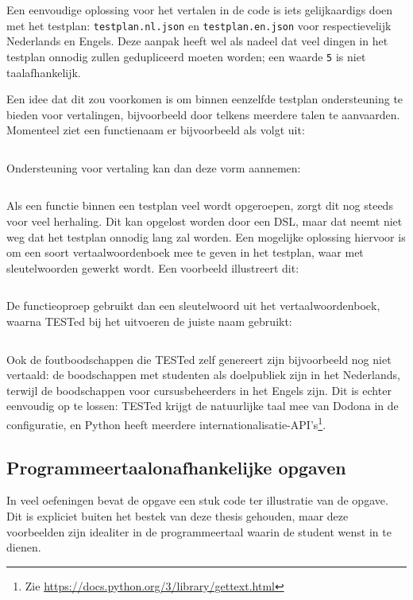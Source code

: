 Een eenvoudige oplossing voor het vertalen in de code is iets gelijkaardigs doen met het testplan: \texttt{testplan.nl.json} en \texttt{testplan.en.json} voor respectievelijk Nederlands en Engels.
Deze aanpak heeft wel als nadeel dat veel dingen in het testplan onnodig zullen gedupliceerd moeten worden;
een waarde \texttt{5} is niet taalafhankelijk.

Een idee dat dit zou voorkomen is om binnen eenzelfde testplan ondersteuning te bieden voor vertalingen, bijvoorbeeld door telkens meerdere talen te aanvaarden.
Momenteel ziet een functienaam er bijvoorbeeld als volgt uit:

\inputminted{json}{code/example-name.json}

Ondersteuning voor vertaling kan dan deze vorm aannemen:

\inputminted{json}{code/example-name-trans.json}

Als een functie binnen een testplan veel wordt opgeroepen, zorgt dit nog steeds voor veel herhaling.
Dit kan opgelost worden door een DSL, maar dat neemt niet weg dat het testplan onnodig lang zal worden.
Een mogelijke oplossing hiervoor is om een soort vertaalwoordenboek mee te geven in het testplan, waar met sleutelwoorden gewerkt wordt.
Een voorbeeld illustreert dit:

\inputminted{json}{code/example-name-dict.json}

De functieoproep gebruikt dan een sleutelwoord uit het vertaalwoordenboek, waarna TESTed bij het uitvoeren de juiste naam gebruikt:

\inputminted{json}{code/example-name-key.json}

Ook de foutboodschappen die TESTed zelf genereert zijn bijvoorbeeld nog niet vertaald: de boodschappen met studenten als doelpubliek zijn in het Nederlands, terwijl de boodschappen voor cursusbeheerders in het Engels zijn.
Dit is echter eenvoudig op te lossen: TESTed krijgt de natuurlijke taal mee van Dodona in de configuratie, en Python heeft meerdere internationalisatie-API's\footnote{Zie \url{https://docs.python.org/3/library/gettext.html}}.

\subsection{Programmeertaalonafhankelijke opgaven}\label{subsec:programmeertaalonafhankelijke-opgaven}

In veel oefeningen bevat de opgave een stuk code ter illustratie van de opgave.
Dit is expliciet buiten het bestek van deze thesis gehouden, maar deze voorbeelden zijn idealiter in de programmeertaal waarin de student wenst in te dienen.


